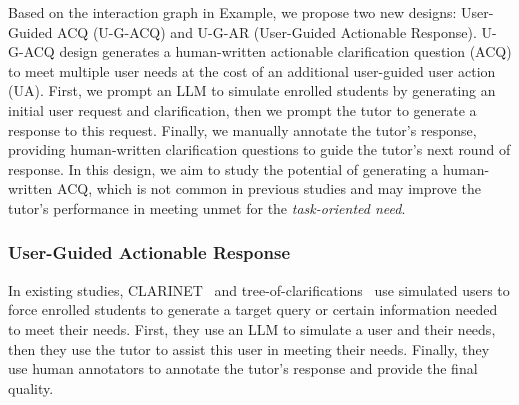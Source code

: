 \documentclass{article} %
\theoremstyle{definition}
\begin{document}
Based on the interaction graph in Example, we propose two new designs: User-Guided ACQ (U-G-ACQ) and U-G-AR (User-Guided Actionable Response).
 U-G-ACQ design generates a human-written actionable clarification question (ACQ) to meet multiple user needs at the cost of an additional user-guided user action (UA).
First, we prompt an LLM to simulate enrolled students by generating an initial user request and clarification, then we prompt the tutor to generate a response to this request. Finally, we manually annotate the tutor's response, providing human-written clarification questions to guide the tutor's next round of response.
In this design, we aim to study the potential of generating a human-written ACQ, which is not common in previous studies and may improve the tutor's performance in meeting unmet for the \textit{task-oriented need}.



\subsubsection{User-Guided Actionable Response}
\label{subsec:ig_agent}
\label{subsec:response_simulator}
In existing studies, CLARINET~\citep{clarinet} and tree-of-clarifications~\citep{tree_of_clarifications} use simulated users to force enrolled students to generate a target query or certain information needed to meet their needs.
First, they use an LLM to simulate a user and their needs, then they use the tutor to assist this user in meeting their needs.
Finally, they use human annotators to annotate the tutor's response and provide the final quality.
\end{document}
